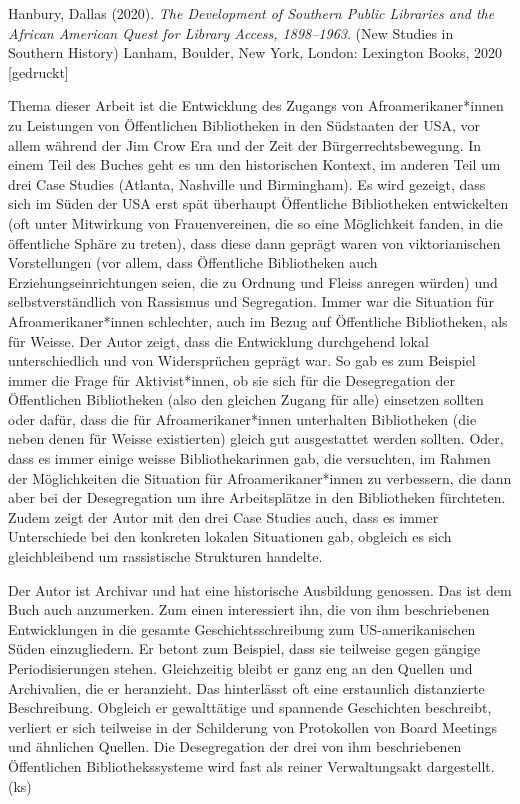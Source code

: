 \documentclass[a4paper,
fontsize=11pt,
oneside,
numbers=noperiodatend,
parskip=half-,
bibliography=totoc,
final
]{scrartcl}
\begin{document}

Hanbury, Dallas (2020). \emph{The Development of Southern Public
Libraries and the African American Quest for Library Access,
1898--1963}. (New Studies in Southern History) Lanham, Boulder, New
York, London: Lexington Books, 2020 {[}gedruckt{]}

Thema dieser Arbeit ist die Entwicklung des Zugangs von
Afroamerikaner*innen zu Leistungen von Öffentlichen Bibliotheken in den
Südstaaten der USA, vor allem während der Jim Crow Era und der Zeit der
Bürgerrechtsbewegung. In einem Teil des Buches geht es um den
historischen Kontext, im anderen Teil um drei Case Studies (Atlanta,
Nashville und Birmingham). Es wird gezeigt, dass sich im Süden der USA
erst spät überhaupt Öffentliche Bibliotheken entwickelten (oft unter
Mitwirkung von Frauenvereinen, die so eine Möglichkeit fanden, in die
öffentliche Sphäre zu treten), dass diese dann geprägt waren von
viktorianischen Vorstellungen (vor allem, dass Öffentliche Bibliotheken
auch Erziehungseinrichtungen seien, die zu Ordnung und Fleiss anregen
würden) und selbstverständlich von Rassismus und Segregation. Immer war
die Situation für Afroamerikaner*innen schlechter, auch im Bezug auf
Öffentliche Bibliotheken, als für Weisse. Der Autor zeigt, dass die
Entwicklung durchgehend lokal unterschiedlich und von Widersprüchen
geprägt war. So gab es zum Beispiel immer die Frage für Aktivist*innen,
ob sie sich für die Desegregation der Öffentlichen Bibliotheken (also
den gleichen Zugang für alle) einsetzen sollten oder dafür, dass die für
Afroamerikaner*innen unterhalten Bibliotheken (die neben denen für
Weisse existierten) gleich gut ausgestattet werden sollten. Oder, dass
es immer einige weisse Bibliothekarinnen gab, die versuchten, im Rahmen
der Möglichkeiten die Situation für Afroamerikaner*innen zu verbessern,
die dann aber bei der Desegregation um ihre Arbeitsplätze in den
Bibliotheken fürchteten. Zudem zeigt der Autor mit den drei Case Studies
auch, dass es immer Unterschiede bei den konkreten lokalen Situationen
gab, obgleich es sich gleichbleibend um rassistische Strukturen handelte.

Der Autor ist Archivar und hat eine historische Ausbildung genossen. Das
ist dem Buch auch anzumerken. Zum einen interessiert ihn, die von ihm
beschriebenen Entwicklungen in die gesamte Geschichtsschreibung zum
US-amerikanischen Süden einzugliedern. Er betont zum Beispiel, dass sie
teilweise gegen gängige Periodisierungen stehen. Gleichzeitig bleibt er
ganz eng an den Quellen und Archivalien, die er heranzieht. Das
hinterlässt oft eine erstaunlich distanzierte Beschreibung. Obgleich er
gewalttätige und spannende Geschichten beschreibt, verliert er sich
teilweise in der Schilderung von Protokollen von Board Meetings und
ähnlichen Quellen. Die Desegregation der drei von ihm beschriebenen
Öffentlichen Bibliothekssysteme wird fast als reiner Verwaltungsakt
dargestellt. (ks)
\end{document}
